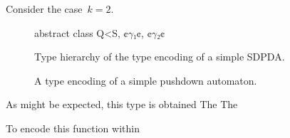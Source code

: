 Consider the case~$k=2$.
\begin{figure}
  \begin{JAVA}
abstract class Q<S, ¢$γ₁$¢, ¢$γ₂$¢
  \end{JAVA}
\end{figure}

\begin{figure}
  \caption{\label{Figure:SDPDA:hierarchy}%
    Type hierarchy of the type encoding of a simple SDPDA.
  }
  \begin{adjustbox}{}
    
  \end{adjustbox}
\end{figure}

\begin{figure}
  \caption{\label{Figure:SDPDA:example}%
    A type encoding of a simple pushdown automaton.
  }
\end{figure}
As might be expected, this type is obtained
The
The

To encode this function within
